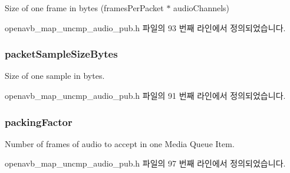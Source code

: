 Size of one frame in bytes (frames\+Per\+Packet $\ast$ audio\+Channels) 



openavb\+\_\+map\+\_\+uncmp\+\_\+audio\+\_\+pub.\+h 파일의 93 번째 라인에서 정의되었습니다.

\subsubsection[{\texorpdfstring{packet\+Sample\+Size\+Bytes}{packetSampleSizeBytes}}]{ packet\+Sample\+Size\+Bytes}\hypertarget{structmedia__q__pub__map__uncmp__audio__info__t_affb5b0213ff6cfafd726c5c7a4958beb}{}\label{structmedia__q__pub__map__uncmp__audio__info__t_affb5b0213ff6cfafd726c5c7a4958beb}


Size of one sample in bytes. 



openavb\+\_\+map\+\_\+uncmp\+\_\+audio\+\_\+pub.\+h 파일의 91 번째 라인에서 정의되었습니다.

\subsubsection[{\texorpdfstring{packing\+Factor}{packingFactor}}]{ packing\+Factor}\hypertarget{structmedia__q__pub__map__uncmp__audio__info__t_af54e12a5e4f46ccf41a32ff0ea9b3405}{}\label{structmedia__q__pub__map__uncmp__audio__info__t_af54e12a5e4f46ccf41a32ff0ea9b3405}


Number of frames of audio to accept in one Media Queue Item. 



openavb\+\_\+map\+\_\+uncmp\+\_\+audio\+\_\+pub.\+h 파일의 97 번째 라인에서 정의되었습니다.

